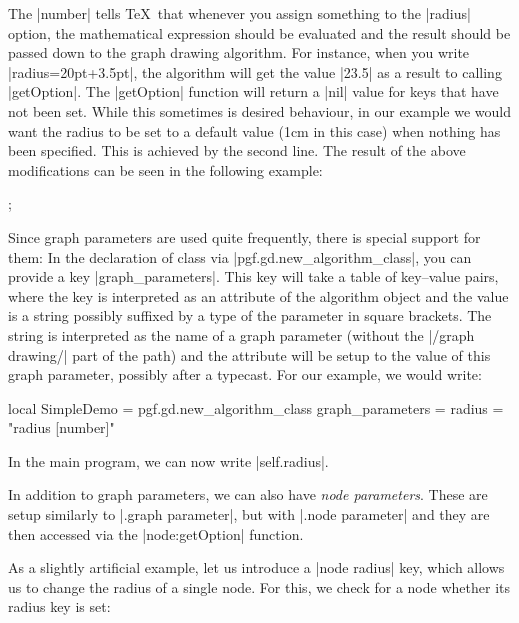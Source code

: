 \begin{codeexample}
\end{codeexample}

The |number| tells \TeX\ that whenever you assign
something to the |radius| option, the mathematical expression should
be evaluated and the result should be passed down to the graph drawing
algorithm. For instance, when you write |radius=20pt+3.5pt|, the
algorithm will get the value |23.5| as a result to calling
|getOption|. The |getOption| function will return a |nil| value for
keys that have not been set. While this sometimes is desired
behaviour, in our example we would want the radius to be set to a
default value (1cm in this case) when nothing has been specified. This
is achieved by the second line. The result of the above modifications
can be seen in the following example:

\begin{codeexample}[]
\tikz {};
\end{codeexample}

Since graph parameters are used quite frequently, there is special
support for them: In the declaration of class via
|pgf.gd.new_algorithm_class|, you can provide a key
|graph_parameters|. This key will take a table of key--value pairs,
where the key is interpreted as an attribute of the algorithm object
and the value is a string possibly suffixed by a type of the parameter
in square brackets. The string is interpreted as the name of a graph
parameter (without the |/graph drawing/| part of the path) and the
attribute will be setup to the value of this graph parameter, possibly
after a typecast. For our example, we would write:

\begin{codeexample}
local SimpleDemo = pgf.gd.new_algorithm_class {
  graph_parameters = { radius = "radius [number]" }
}
\end{codeexample}
In the main program, we can now write |self.radius|.

In addition to graph parameters, we can also have \emph{node
  parameters}. These are setup similarly to |.graph parameter|, but
with |.node parameter| and they are then accessed via the
|node:getOption| function.

As a slightly artificial example, let us introduce a |node radius|
key, which allows us to change the radius of a single node. For this,
we check for a node whether its radius key is set:

